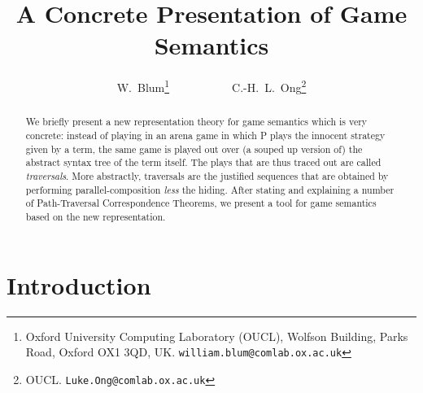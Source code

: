 
\def\toolname{HOG}

\title{A Concrete Presentation of Game Semantics}

\author{W.~Blum\thanks{Oxford University Computing Laboratory (OUCL), Wolfson Building, Parks Road, Oxford OX1 3QD, UK. {\tt william.blum@comlab.ox.ac.uk}}~~~~~~~~~~~C.-H.~L.~Ong\thanks{OUCL. {\tt Luke.Ong@comlab.ox.ac.uk}}}
\date{}



\maketitle \thispagestyle{empty}

\begin{abstract}
We briefly present a new representation theory for game semantics which is very concrete: instead of playing in an arena game in which P plays the innocent strategy given by a term, the same game is played out over (a souped up version of) the abstract syntax tree of the term itself. The plays that are thus traced out are called \emph{traversals}. More abstractly, traversals are the justified sequences that are obtained by performing parallel-composition \emph{less} the hiding. After stating and explaining a number of Path-Traversal Correspondence Theorems, we present a tool for game semantics based on the new representation.
\end{abstract}


\section{Introduction}

